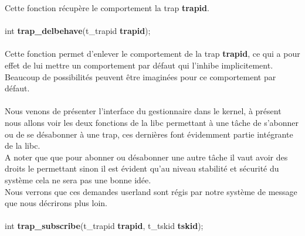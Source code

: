 \documentclass[10pt,a4wide]{article}
\begin{document}
Cette fonction r\'ecup\`ere le comportement la trap \textbf{trapid}.

\paragraph{}

\hspace{1.5cm}int \textbf{trap\_delbehave}(t\_trapid \textbf{trapid});

\paragraph{}

Cette fonction permet d'enlever le comportement de la trap \textbf{trapid}, ce qui a pour effet de lui mettre
un comportement par d\'efaut qui l'inhibe implicitement.\\
Beaucoup de possibilit\'es peuvent \^etre imagin\'ees pour ce comportement par d\'efaut.

\paragraph{}

Nous venons de pr\'esenter l'interface du gestionnaire dans le kernel, \`a pr\'esent nous allons voir les deux fonctions
de la libc permettant \`a une t\^ache de s'abonner ou de se d\'esabonner \`a une trap, ces derni\`eres font \'evidemment
partie int\'egrante de la libc.\\
A noter que que pour abonner ou d\'esabonner une autre t\^ache il vaut avoir des droits le permettant sinon il est
\'evident qu'au niveau stabilit\'e et s\'ecurit\'e du syst\`eme cela ne sera pas une bonne id\'ee.\\
Nous verrons que ces demandes userland sont r\'egis par notre syst\`eme de message que nous d\'ecrirons plus loin.

\paragraph{}

\hspace{1.5cm}int \textbf{trap\_subscribe}(t\_trapid \textbf{trapid},
                                           t\_tskid \textbf{tskid});

\paragraph{}
\end{document}
